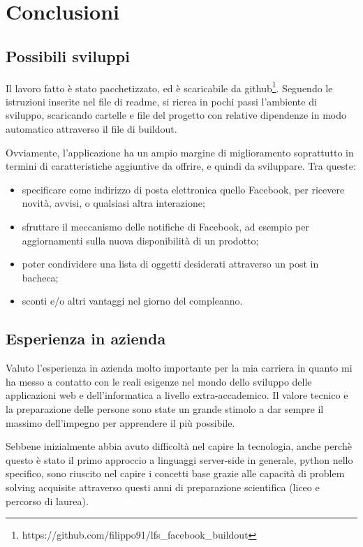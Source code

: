 \chapter{Conclusioni}
\section{Possibili sviluppi}
Il lavoro fatto è stato pacchetizzato, ed è scaricabile da github\footnote{https://github.com/filippo91/lfs\_facebook\_buildout}. Seguendo le istruzioni inserite nel file di readme, si ricrea in pochi passi l'ambiente di sviluppo, scaricando cartelle e file del progetto con relative dipendenze in modo automatico attraverso il file di buildout.

\vspace{2.5 mm}
Ovviamente, l'applicazione ha un ampio margine di miglioramento soprattutto in termini di caratteristiche aggiuntive da offrire, e quindi da sviluppare.
Tra queste:
 \begin{itemize}
	\item specificare come indirizzo di posta elettronica quello Facebook, per ricevere novità, avvisi, o qualsiasi altra interazione;
	\item sfruttare il meccanismo delle notifiche di Facebook, ad esempio per aggiornamenti sulla nuova disponibilità di un prodotto;
	\item poter condividere una lista di oggetti desiderati attraverso un post in bacheca;
	\item sconti e/o altri vantaggi nel giorno del compleanno.
\end{itemize}

\section{Esperienza in azienda}
Valuto l'esperienza in azienda molto importante per la mia carriera in quanto mi ha messo a contatto con le reali esigenze nel mondo dello sviluppo delle applicazioni web e dell'informatica a livello extra-accademico. Il valore tecnico e la preparazione delle persone sono state un grande stimolo a dar sempre il massimo dell'impegno per apprendere il più possibile.

\vspace{2.5 mm}
Sebbene inizialmente abbia avuto difficoltà nel capire la tecnologia, anche perchè questo è stato il primo approccio a linguaggi server-side in generale, python nello specifico, sono riuscito nel capire i concetti base grazie alle capacità di problem solving acquisite attraverso questi anni di preparazione scientifica (liceo e percorso di laurea). 

